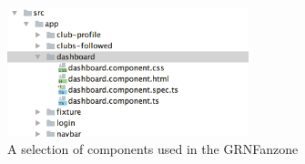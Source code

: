 \begin{figure}[H]
\begin{center}
\includegraphics[width=7cm]{figures/frontend_components}
\end{center}
\caption{A selection of components used in the GRNFanzone}
\label{fig:frontend_components}
\end{figure}

